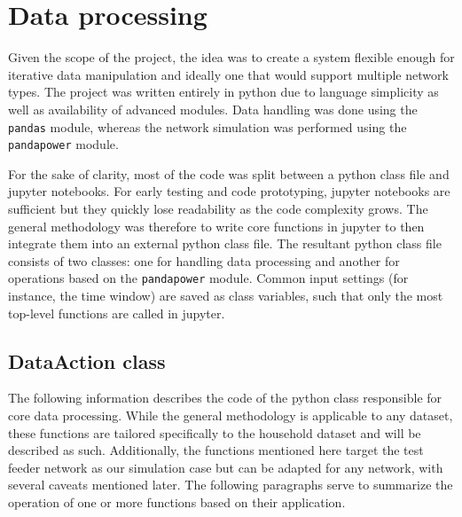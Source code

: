 \documentclass[a4paper,10pt]{report}
\begin{document}
\newpage
\section{Data processing}\label{section_data_processing}
Given the scope of the project, the idea was to create a system flexible enough for iterative data manipulation and ideally one that would support multiple network types. The project was written entirely in python due to language simplicity as well as availability of advanced modules. Data handling was done using the \texttt{pandas} module, whereas the network simulation was performed using the \texttt{pandapower} module.

For the sake of clarity, most of the code was split between a python class file and jupyter notebooks. For early testing and code prototyping, jupyter notebooks are sufficient but they quickly lose readability as the code complexity grows. The general methodology was therefore to write core functions in jupyter to then integrate them into an external python class file. The resultant python class file consists of two classes: one for handling data processing and another for operations based on the \texttt{pandapower} module. Common input settings (for instance, the time window) are saved as class variables, such that only the most top-level functions are called in jupyter.

\subsection{DataAction class}
The following information describes the code of the python class responsible for core data processing. While the general methodology is applicable to any dataset, these functions are tailored specifically to the household dataset and will be described as such. Additionally, the functions mentioned here target the test feeder network as our simulation case but can be adapted for any network, with several caveats mentioned later. The following paragraphs serve to summarize the operation of one or more functions based on their application.
\end{document}
